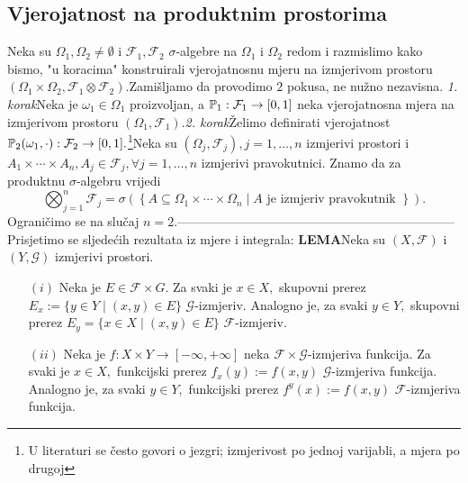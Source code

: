 \documentclass{article}
\begin{document}
\subsection{Vjerojatnost na produktnim prostorima}
Neka su \(\Omega_1,\Omega_2\ne\emptyset\) i \(\mathcal F_1,\mathcal F_2\) \(\sigma\)-algebre na \(\Omega_1\) i \(\Omega_2\) redom i razmislimo kako bismo, "u koracima" konstruirali vjerojatnosnu mjeru na izmjerivom prostoru \((\Omega_1\times\Omega_2,\mathcal F_1\otimes\mathcal F_2).\)\newline Zamišljamo da provodimo \(2\) pokusa, ne nužno nezavisna. \newline\textit{1. korak}\newline Neka je \(\omega_1\in\Omega_1\) proizvoljan, a \(\Bbb P_1:\mathcal F_1\to[0,1]\) neka vjerojatnosna mjera na izmjerivom prostoru \((\Omega_1,\mathcal F_1).\)\newline\textit{2. korak}\newline Želimo definirati vjerojatnost \(\Bbb P_2(\omega_1,\cdot):\mathcal F_2\to[0,1].\)\footnote[55]{U literaturi se često govori o jezgri; izmjerivost po jednoj varijabli, a mjera po drugoj}\newline\newline Neka su \((\Omega_j,\mathcal F_j),j=1,\ldots,n\) izmjerivi prostori i \(A_1\times\cdots\times A_n, A_j\in\mathcal F_j,\forall j=1,\ldots,n\) izmjerivi pravokutnici. Znamo da za produktnu \(\sigma\)-algebru vrijedi \[\bigotimes_{j=1}^n\mathcal F_j=\sigma\left(\left\{A\subseteq\Omega_1\times\cdots\times\Omega_n\mid A\text{ je izmjeriv pravokutnik }\right\}\right).\] Ograničimo se na slučaj \(n=2.\)\newline\newline------------------------------------------------------------------\newline\newline Prisjetimo se sljedećih rezultata iz mjere i integrala:\newline\newline
\textbf{LEMA}\newline Neka su \((X,\mathcal F)\) i \((Y,\mathcal G)\) izmjerivi prostori.
\begin{enumerate}
    \item[\((i)\)] Neka je \(E\in\mathcal F\times G.\) Za svaki je \(x\in X,\) skupovni prerez \(E_x:=\{y\in Y\mid(x,y)\in E\}\) \(\mathcal G\)-izmjeriv. Analogno je, za svaki \(y\in Y,\) skupovni prerez \(E_y=\{x\in X\mid(x,y)\in E\}\) \(\mathcal F\)-izmjeriv.
    \item[\((ii)\)] Neka je \(f:X\times Y\to[-\infty,+\infty]\) neka \(\mathcal F\times\mathcal G\)-izmjeriva funkcija. Za svaki je \(x\in X,\) funkcijski prerez \(f_x(y):=f(x,y)\) \(\mathcal G\)-izmjeriva funkcija. Analogno je, za svaki \(y\in Y,\) funkcijski prerez \(f^y(x):=f(x,y)\) \(\mathcal F\)-izmjeriva funkcija.
\end{enumerate}
\end{document}
